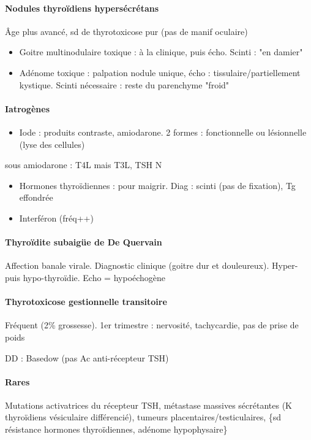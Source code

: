 \documentclass[11pt]{article}
\begin{document}
\paragraph{Nodules thyroïdiens hypersécrétans}
\label{sec:org2618a98}
Âge plus avancé, sd de thyrotoxicose pur (pas de manif oculaire) 
\begin{itemize}
\item Goitre multinodulaire toxique : à la clinique, puis écho. Scinti : "en damier"
\item Adénome toxique : palpation nodule unique, écho : tissulaire/partiellement
kystique. Scinti nécessaire : reste du parenchyme "froid"
\end{itemize}

\paragraph{Iatrogènes}
\label{sec:org54ce878}
\begin{itemize}
\item Iode : produits contraste, amiodarone. 2 formes : fonctionnelle ou lésionnelle
(lyse des cellules)
\end{itemize}
\danger sous amiodarone : T4L \inc mais T3L, TSH N 
\begin{itemize}
\item Hormones thyroïdiennes : pour maigrir. Diag : scinti (pas de fixation), Tg
effondrée
\item Interféron (fréq++)
\end{itemize}

\paragraph{Thyroïdite subaigüe de De Quervain}
\label{sec:orgfccbae2}
Affection banale virale. Diagnostic clinique (goitre dur et douleureux). Hyper-
puis hypo-thyroïdie. Echo = hypoéchogène

\paragraph{Thyrotoxicose gestionnelle transitoire}
\label{sec:orge709def}
Fréquent (2\% grossesse). 1er trimestre : nervosité, tachycardie, pas de prise de
poids

DD : Basedow (pas Ac anti-récepteur TSH)

\paragraph{Rares}
\label{sec:org92220f2}
Mutations activatrices du récepteur TSH, métastase massives sécrétantes (K
thyroïdiens vésiculaire différencié), tumeurs placentaires/testiculaires, \{sd
résistance hormones thyroïdiennes, adénome hypophysaire\}
\end{document}
